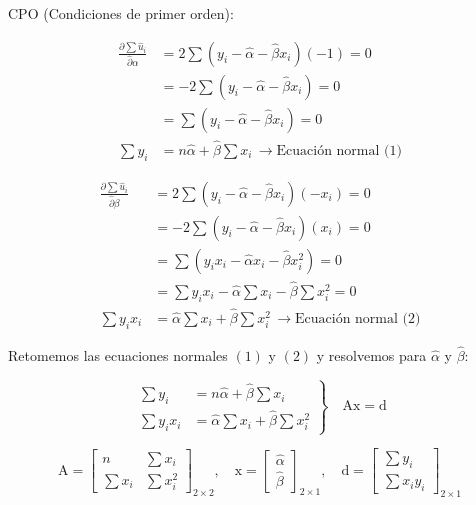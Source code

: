 \documentclass[
]{book}
\begin{document}
CPO (Condiciones de primer orden):

\[
\begin{aligned}
\frac{ \partial \sum \hat{u}_{i} }{ \hat{\partial} \alpha } &= 2 \sum (y_{i} - \hat{\alpha } - \hat{\beta}x_{i})(-1) = 0  \\
&= -2 \sum (y_{i} - \hat{\alpha } - \hat{\beta}x_{i}) = 0 \\
&= \sum (y_{i} - \hat{\alpha } - \hat{\beta}x_{i}) = 0 \\
\sum y_{i} &= n \hat{\alpha } + \hat{\beta}\sum x_{i} \, \rightarrow \text{Ecuación normal (1)}
\end{aligned}
\]

\[
\begin{aligned}
\frac{ \partial \sum \hat{u}_{i} }{ \hat{\partial} \beta } &= 2 \sum (y_{i} - \hat{\alpha } - \hat{\beta}x_{i})(-x_{i}) = 0  \\
&= -2 \sum (y_{i} - \hat{\alpha } - \hat{\beta}x_{i})(x_{i}) = 0 \\
&= \sum (y_{i}x_{i} - \hat{\alpha } x_{i} - \hat{\beta}x_{i}^2) = 0 \\
&= \sum y_{i}x_{i} - \hat{\alpha }\sum x_{i} - \hat{\beta}\sum x_{i}^2 = 0 \\
\sum y_{i}x_{i} &= \hat{\alpha }\sum x_{i} + \hat{\beta}\sum x_{i}^2 \, \rightarrow \text{Ecuación normal (2)}
\end{aligned}
\]

Retomemos las ecuaciones normales \((1)\) y \((2)\) y resolvemos para \(\hat \alpha\) y \(\hat \beta\):

\[
\left .  
\begin{aligned}  
\sum y_{i} &= n \hat{\alpha } + \hat{\beta}\sum x_{i} \\
\sum y_{i}x_{i} &= \hat{\alpha }\sum x_{i} + \hat{\beta}\sum x_{i}^2 
\end{aligned} 
\right\}  
\quad \mathrm{Ax = d}
\]

\[
\mathrm{A} = 
\begin{bmatrix}
n & \sum x_{i} \\
\sum x_{i} & \sum x_{i}^2
\end{bmatrix}_{2 \times 2}
,
\quad 
\mathrm{x} =
\begin{bmatrix}
\hat{\alpha} \\
\hat{ \beta}
\end{bmatrix}_{2 \times 1}
,
\quad
\mathrm{d} = 
\begin{bmatrix}
\sum y_{i}  \\
\sum x_{i} y_{i}
\end{bmatrix}_{2 \times 1}
\]

  
\end{document}
